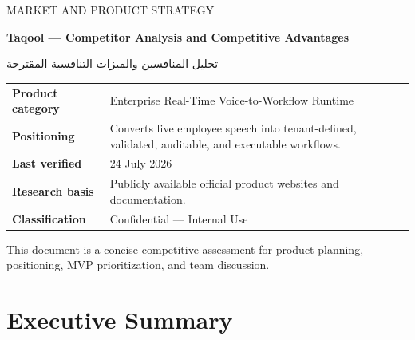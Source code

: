 \documentclass[10.5pt,a4paper]{article}
\newcommand{\BrandName}{Taqool}
\newcommand{\DocumentTitle}{Competitor Analysis and Competitive Advantages}
\newcommand{\VerificationDate}{24 July 2026}
\begin{document}
\begin{titlepage}
  \thispagestyle{empty}
  \vspace*{18mm}

  {\sffamily\Large\color{Secondary} MARKET AND PRODUCT STRATEGY}

  \vspace{8mm}

  {\sffamily\bfseries\fontsize{28}{34}\selectfont\color{Primary}
    \BrandName{} --- \DocumentTitle
  }

  \vspace{4mm}

  {\Large\color{TextMuted}
    \textarabic{تحليل المنافسين والميزات التنافسية المقترحة}
  }

  \vspace{14mm}

  \begin{summarybox}
    \begin{tabularx}{\textwidth}{L{38mm}Y}
      \textbf{Product category} & Enterprise Real-Time Voice-to-Workflow Runtime \\
      \textbf{Positioning} & Converts live employee speech into tenant-defined, validated, auditable, and executable workflows. \\
      \textbf{Last verified} & \VerificationDate \\
      \textbf{Research basis} & Publicly available official product websites and documentation. \\
      \textbf{Classification} & Confidential --- Internal Use \\
    \end{tabularx}
  \end{summarybox}

  \vfill

  \begin{center}
    {\sffamily\small\color{TextMuted}
      This document is a concise competitive assessment for product planning,
      positioning, MVP prioritization, and team discussion.
    }
  \end{center}
\end{titlepage}

\tableofcontents
\newpage

\section{Executive Summary}
\end{document}
